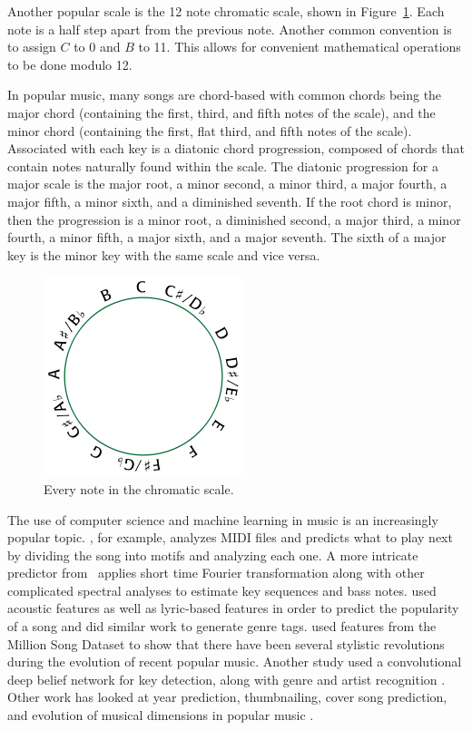 \documentclass[letterpaper]{article}
\begin{document}
Another popular scale is the 12 note chromatic scale, shown in Figure~\ref{chromatic}. Each note is a half step apart from the previous note. Another common convention is to assign $C$ to 0 and $B$ to 11. This allows for convenient mathematical operations to be done modulo 12.

In popular music, many songs are chord-based with common chords being the major chord (containing the first, third, and fifth notes of the scale), and the minor chord (containing the first, flat third, and fifth notes of the scale).  Associated with each key is a diatonic chord progression, composed of chords that contain notes naturally found within the scale.  The diatonic progression for a major scale is the major root, a minor second, a minor third, a major fourth, a major fifth, a minor sixth, and a diminished seventh.  If the root chord is minor, then the progression is a minor root, a diminished second, a major third, a minor fourth, a minor fifth, a major sixth, and a major seventh.  The sixth of a major key is the minor key with the same scale and vice versa.

\begin{figure}[ht]
	\centering
	\includegraphics[width = 0.5\columnwidth]{chromatic.png}
	\caption{Every note in the chromatic scale.}
	\label{chromatic} 
\end{figure} 

The use of computer science and machine learning in music is an increasingly popular topic. \cite{dubnov2003using}, for example, analyzes MIDI files and predicts what to play next by dividing the song into motifs and analyzing each one. A more intricate predictor from~\cite{ni2012end} applies short time Fourier transformation along with other complicated spectral analyses to estimate key sequences and bass notes. \cite{dhanaraj2005automatic} used acoustic features as well as lyric-based features in order to predict the popularity of a song and \cite{eck2007autotagging} did similar work to generate genre tags.  \cite{mauch2015evolution} used features from the Million Song Dataset to show that there have been several stylistic revolutions during the evolution of recent popular music.  Another study used a convolutional deep belief network for key detection, along with genre and artist recognition \cite{Dieleman}.  Other work has looked at year prediction, thumbnailing, cover song prediction, and evolution of musical dimensions in popular music \cite{Foster3,Chai,Foster2,Serra}.
\end{document}
